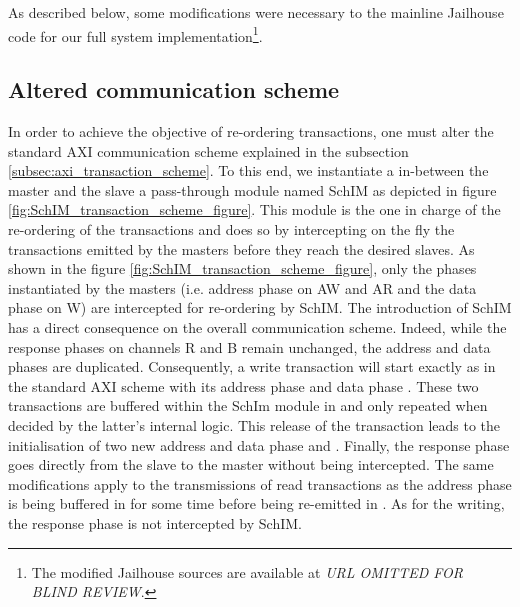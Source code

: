 As described below, some modifications were necessary to the mainline
Jailhouse code for our full system implementation\footnote{The
  modified Jailhouse sources are available at \emph{URL OMITTED FOR
    BLIND REVIEW}.}.



\subsection{Altered communication scheme}
\label{subsec:communication-scheme}

In order to achieve the objective of re-ordering transactions, one
must alter the standard AXI communication scheme explained in the
subsection \ref{subsec:axi_transaction_scheme}.  To this end, we
instantiate a in-between the master and the slave a pass-through
module named SchIM as depicted in figure
\ref{fig:SchIM_transaction_scheme_figure}.  This module is the one in
charge of the re-ordering of the transactions and does so by
intercepting on the fly the transactions emitted by the masters before
they reach the desired slaves.  As shown in the figure
\ref{fig:SchIM_transaction_scheme_figure}, only the phases
instantiated by the masters (i.e. address phase on AW and AR and the
data phase on W) are intercepted for re-ordering by SchIM.  The
introduction of SchIM has a direct consequence on the overall
communication scheme. Indeed, while the response phases on channels R
and B remain unchanged, the address and data phases are duplicated.
Consequently, a write transaction will start exactly as in the
standard AXI scheme with its address phase  and data phase
.  These two transactions are buffered within the SchIm
module in  and only repeated when decided by the latter's
internal logic.  This release of the transaction leads to the
initialisation of two new address and data phase  and
.  Finally, the response phase  goes directly
from the slave to the master without being intercepted.  The same
modifications apply to the transmissions of read transactions as the
address phase  is being buffered in  for some
time before being re-emitted in .  As for the writing, the
response phase  is not intercepted by SchIM.


